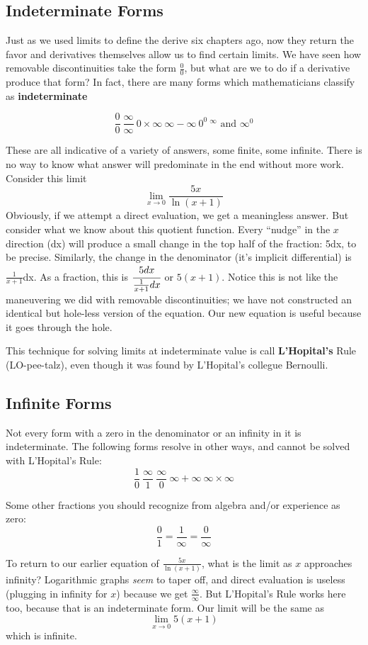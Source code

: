 
\subsection{Indeterminate Forms}



Just as we used limits to define the derive six chapters ago, now they return the favor
and derivatives themselves allow us to find certain limits.  We have seen how removable
discontinuities take the form $\frac{0}{0}$, but what are we to do if a derivative
produce that form?  In fact, there are many forms which mathematicians classify
as \textbf{indeterminate}

$$
\frac{0}{0} ~ \frac{\infty}{\infty} ~ 0\times\infty ~ \infty-\infty ~ 0^0 ~ ^\infty \text{ and } \infty^0 
$$

These are all indicative of a variety of answers, some finite, some infinite.  There is
no way to know what answer will predominate in the end without more work.
Consider this limit
$$
\lim_{x\rightarrow0}\frac{5x}{\ln(x+1)}
$$
Obviously, if we attempt a direct evaluation, we get a meaningless answer.  But
consider what we know about this quotient function.  Every ``nudge'' in the $x$
direction (dx) will produce a small change in the top half of the fraction: 5dx, to
be precise.  Similarly, the change in the denominator (it's implicit differential)
is $\frac{1}{x+1}$dx.  As a fraction, this is $\cfrac{5dx}{\frac{1}{x+1}dx}$ or 
$5(x+1)$.  Notice this is not like the maneuvering we did with removable 
discontinuities; we have not constructed an identical but hole-less version
of the equation.  Our new equation is useful because it goes through the hole.


This technique for solving limits at indeterminate value is call \textbf{L'Hopital's}
Rule (LO-pee-talz), even though it was found by L'Hopital's collegue Bernoulli.

\subsection{Infinite Forms}
Not every form with a zero in the denominator or an infinity in it is indeterminate.
The following forms resolve in other ways, and cannot be solved with L'Hopital's
Rule:
$$
\frac{1}{0} ~ \frac{\infty}{1} ~ \frac{\infty}{0} ~ \infty + \infty ~ \infty \times\infty
$$

Some other fractions you should recognize from algebra and/or experience as zero:
$$
\frac{0}{1} = \frac{1}{\infty} = \frac{0}{\infty}
$$

To return to our earlier equation of $\frac{5x}{\ln(x+1)}$, what is the limit as $x$ 
approaches infinity?  Logarithmic graphs \emph{seem} to taper off, and direct 
evaluation is useless (plugging in infinity for $x$) because we get $\frac{\infty}{\infty}$.
But L'Hopital's Rule works here too, because that is an indeterminate form.
Our limit will be the same as 
$$
\lim_{x\rightarrow0}5(x+1)
$$
which is infinite.